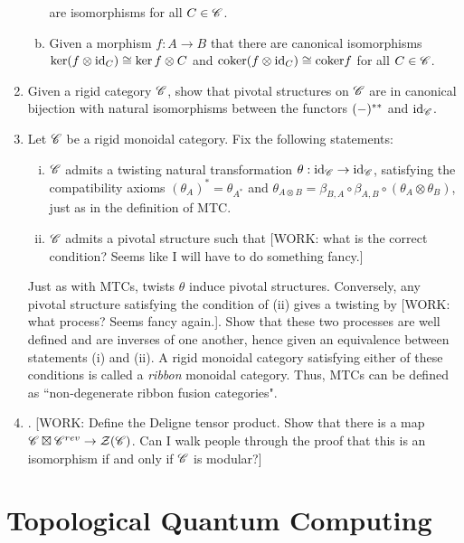 \documentclass{article}
\theoremstyle{definition}
\numberwithin{figure}{section}
\begin{document}
\begin{enumerate}[\thesection .1.]
\begin{enumerate}[(a)]
are isomorphisms for all $C\in \mathscr{C}$.

\item Given a morphism $f:A\to B$ that there are canonical isomorphisms $\ker (f\otimes \mathrm{id}_C)\cong \ker f\otimes C$ and $\mathrm{coker} (f\otimes \mathrm{id}_C)\cong \mathrm{coker} f$ for all $C\in \mathscr{C}$.
\end{enumerate}

\item Given a rigid category $\mathscr{C}$, show that pivotal structures on $\mathscr{C}$ are in canonical bijection with natural isomorphisms between the functors $(\--)^{**}$ and $\mathrm{id}_{\mathscr{C}}$.

\item Let $\mathscr{C}$ be a rigid monoidal category. Fix the following statements:

\begin{enumerate}[(i)]
\item $\mathscr{C}$ admits a twisting natural transformation $\theta:\mathrm{id}_{\mathscr{C}}\to \mathrm{id}_{\mathscr{C}}$, satisfying the compatibility axioms $(\theta_A)^{*}=\theta_{A^*}$ and $\theta_{A\otimes B}=\beta_{B,A}\circ \beta_{A,B}\circ (\theta_{A}\otimes \theta_{B})$, just as in the definition of MTC.

\item $\mathscr{C}$ admits a pivotal structure such that [WORK: what is the correct condition? Seems like I will have to do something fancy.]
\end{enumerate}

Just as with MTCs, twists $\theta$ induce pivotal structures. Conversely, any pivotal structure satisfying the condition of (ii) gives a twisting by [WORK: what process? Seems fancy again.]. Show that these two processes are well defined and are inverses of one another, hence given an equivalence between statements (i) and (ii). A rigid monoidal category satisfying either of these conditions is called a \textit{ribbon} monoidal category. Thus, MTCs can be defined as ``non-degenerate ribbon fusion categories".

\item . [WORK: Define the Deligne tensor product. Show that there is a map $\mathscr{C}\boxtimes \mathscr{C}^{rev}\to \mathcal{Z}(\mathscr{C})$. Can I walk people through the proof that this is an isomorphism if and only if $\mathscr{C}$ is modular?]
\end{enumerate}

\section{Topological Quantum Computing}
\label{Topological Quantum Computing}
\end{document}
